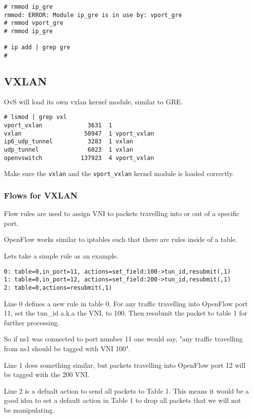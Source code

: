 \documentclass[letter]{article}
\begin{document}
{{\begin{appendices}
\begin{lstlisting}
# rmmod ip_gre
rmmod: ERROR: Module ip_gre is in use by: vport_gre
# rmmod vport_gre
# rmmod ip_gre

# ip add | grep gre
# 
\end{lstlisting}

\subsection{VXLAN}
\label{appendix:vxlan}

OvS will load its own vxlan kernel module, similar to GRE.

\begin{lstlisting}
# lsmod | grep vxl
vport_vxlan             3631  1
vxlan                  50947  1 vport_vxlan
ip6_udp_tunnel          3283  1 vxlan
udp_tunnel              6023  1 vxlan
openvswitch           137923  4 vport_vxlan
\end{lstlisting}

Make sure the \texttt{vxlan} and the \texttt{vport\_vxlan} kernel module is loaded correctly.

\subsubsection{Flows for VXLAN}
\label{appendix:vxlan-flows}

Flow rules are used to assign VNI to packets travelling into or out of a specific port. 

OpenFlow works similar to iptables such that there are rules inside of a table.

Lets take a simple rule as an example.
\begin{lstlisting}
0: table=0,in_port=11, actions=set_field:100->tun_id,resubmit(,1)
1: table=0,in_port=12, actions=set_field:200->tun_id,resubmit(,1)
2: table=0,actions=resubmit(,1)
\end{lstlisting}
Line 0 defines a new rule in table 0. For any traffic travelling into OpenFlow port 11, set the tun\_id a.k.a the VNI, to 100. Then resubmit the packet to table 1 for further processing. 

So if ns1 was connected to port number 11 one would say, "any traffic travelling from ns1 should be tagged with VNI 100".

Line 1 does something similar, but packets travelling into OpenFlow port 12 will be tagged with the 200 VNI.

Line 2 is a defualt action to send all packets to Table 1. This means it would be a good idea to set a default action in Table 1 to drop all packets that we will not be manipulating.


\end{appendices}}}
\end{document}
